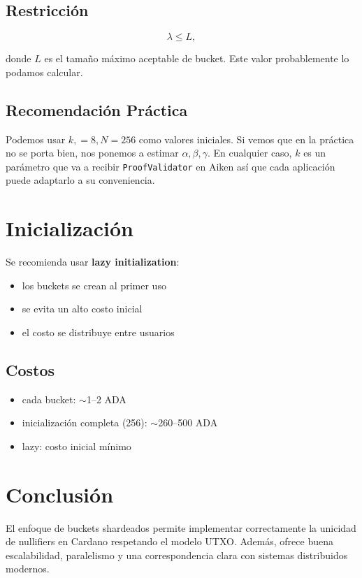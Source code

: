 \documentclass[11pt]{article}
\begin{document}
	\subsection{Restricción}
	
	$$\lambda \leq L,$$
	
	donde $L$ es el tamaño máximo aceptable de bucket. Este valor probablemente lo podamos calcular.
	
	\subsection{Recomendación Práctica}
	
	Podemos usar $k, = 8, N = 256$ como valores iniciales. Si vemos que en la práctica no se porta bien, nos ponemos a estimar $\alpha, \beta, \gamma$. En cualquier caso, $k$ es un parámetro que va a recibir \texttt{ProofValidator} en Aiken así que cada aplicación puede adaptarlo a su conveniencia.
	
	\section{Inicialización}
	
	Se recomienda usar \textbf{lazy initialization}:
	
	\begin{itemize}
		\item los buckets se crean al primer uso
		\item se evita un alto costo inicial
		\item el costo se distribuye entre usuarios
	\end{itemize}
	
	\subsection{Costos}
	
	\begin{itemize}
		\item cada bucket: $\sim$1--2 ADA
		\item inicialización completa (256): $\sim$260--500 ADA
		\item lazy: costo inicial mínimo
	\end{itemize}
	
	\section{Conclusión}
	
	El enfoque de buckets shardeados permite implementar correctamente la unicidad de nullifiers en Cardano respetando el modelo UTXO. Además, ofrece buena escalabilidad, paralelismo y una correspondencia clara con sistemas distribuidos modernos.
	
\end{document}
